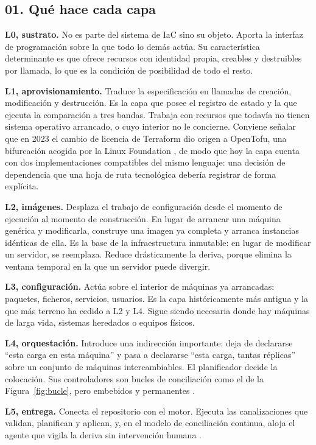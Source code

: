 \documentclass[11pt,letterpaper]{article}
\begin{document}
\subsection*{01. Qué hace cada capa}

\textbf{L0, sustrato.} No es parte del sistema de IaC sino su objeto. Aporta
la interfaz de programación sobre la que todo lo demás actúa. Su
característica determinante es que ofrece recursos con identidad propia,
creables y destruibles por llamada, lo que es la condición de posibilidad de
todo el resto.

\textbf{L1, aprovisionamiento.} Traduce la especificación en llamadas de
creación, modificación y destrucción. Es la capa que posee el registro de
estado y la que ejecuta la comparación a tres bandas. Trabaja con recursos que
todavía no tienen sistema operativo arrancado, o cuyo interior no le
concierne. Conviene señalar que en 2023 el cambio de licencia de Terraform dio
origen a OpenTofu, una bifurcación acogida por la Linux Foundation
\parencite{opentofu}, de modo que hoy la capa cuenta con dos implementaciones
compatibles del mismo lenguaje: una decisión de dependencia que una hoja de
ruta tecnológica debería registrar de forma explícita.

\textbf{L2, imágenes.} Desplaza el trabajo de configuración desde el momento
de ejecución al momento de construcción. En lugar de arrancar una máquina
genérica y modificarla, construye una imagen ya completa y arranca instancias
idénticas de ella. Es la base de la infraestructura inmutable: en lugar de
modificar un servidor, se reemplaza. Reduce drásticamente la deriva, porque
elimina la ventana temporal en la que un servidor puede divergir.

\textbf{L3, configuración.} Actúa sobre el interior de máquinas ya arrancadas:
paquetes, ficheros, servicios, usuarios. Es la capa históricamente más antigua
y la que más terreno ha cedido a L2 y L4. Sigue siendo necesaria donde hay
máquinas de larga vida, sistemas heredados o equipos físicos.

\textbf{L4, orquestación.} Introduce una indirección importante: deja de
declararse \enquote{esta carga en esta máquina} y pasa a declararse
\enquote{esta carga, tantas réplicas} sobre un conjunto de máquinas
intercambiables. El planificador decide la colocación. Sus controladores son
bucles de conciliación como el de la Figura~\ref{fig:bucle}, pero embebidos y
permanentes \parencite{k8scontrollers}.

\textbf{L5, entrega.} Conecta el repositorio con el motor. Ejecuta las
canalizaciones que validan, planifican y aplican, y, en el modelo de
conciliación continua, aloja el agente que vigila la deriva sin intervención
humana \parencite{opengitops,humble2010}.
\end{document}
